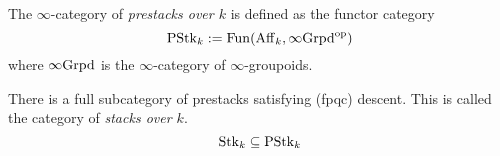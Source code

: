\documentclass[./main.tex]{subfiles}
\begin{document}
\begin{dfn}
  
  The $\infty$-category of \emph{prestacks over $k$} is defined as
  the functor category
  \[
    \operatorname{PStk}_k := \mathrm{Fun}(\mathrm{Aff}_k , \infty\mathrm{Grpd}^{\mathrm{op}})
  \]
  where $\infty\mathrm{Grpd}$ is the $\infty$-category of $\infty$-groupoids.

  There is a full subcategory of prestacks satisfying 
  (fpqc) descent.
  This is called the category of \emph{stacks over $k$}.
  \[
    \operatorname{Stk}_k \subseteq \operatorname{PStk}_k
  \]
\end{dfn}
\end{document}
